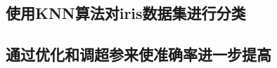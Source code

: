 \documentclass[utf-8]{article}
\begin{document}
\subsection{使用KNN算法对iris数据集进行分类}


	

\subsection{通过优化和调超参来使准确率进一步提高}
 



\end{document}
